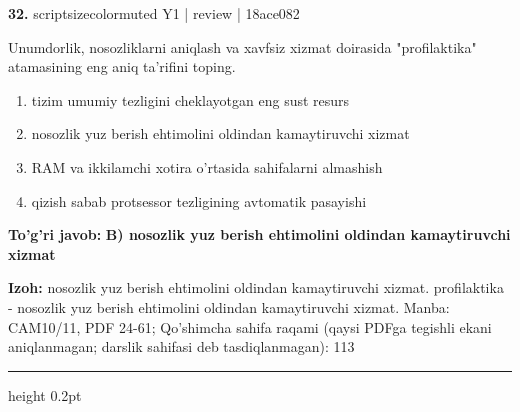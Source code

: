 \documentclass[10pt,a4paper]{article}
\begin{document}
{\bfseries\sffamily\color{ink} 32.} {scriptsizecolor{muted} Y1 | review | 18ace082}
\par
Unumdorlik, nosozliklarni aniqlash va xavfsiz xizmat doirasida "profilaktika" atamasining eng aniq ta'rifini toping.
\begin{enumerate}[label=\Alph*),leftmargin=9mm]
\item tizim umumiy tezligini cheklayotgan eng sust resurs
\item nosozlik yuz berish ehtimolini oldindan kamaytiruvchi xizmat
\item RAM va ikkilamchi xotira o'rtasida sahifalarni almashish
\item qizish sabab protsessor tezligining avtomatik pasayishi
\end{enumerate}
\begin{tcolorbox}[enhanced,breakable,colback=teal!4,colframe=teal!60!black,boxrule=0.45pt,arc=1.2mm,left=2.7mm,right=2.7mm,top=1.8mm,bottom=1.8mm,before skip=2mm,after skip=2mm]
{\bfseries\sffamily\color{teal}To'g'ri javob:} \textbf{B) nosozlik yuz berish ehtimolini oldindan kamaytiruvchi xizmat}
\par\smallskip
{\bfseries Izoh:} nosozlik yuz berish ehtimolini oldindan kamaytiruvchi xizmat. profilaktika - nosozlik yuz berish ehtimolini oldindan kamaytiruvchi xizmat. Manba: CAM10/11, PDF 24-61; Qo'shimcha sahifa raqami (qaysi PDFga tegishli ekani aniqlanmagan; darslik sahifasi deb tasdiqlanmagan): 113
\end{tcolorbox}
\vspace{2mm}\hrule height 0.2pt\vspace{3mm}
\end{document}
